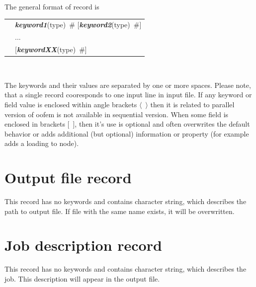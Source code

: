 \documentclass[a4paper]{article}
\makeatletter
\newcommand{\keywordnotype}[1]{\mbox{{\it{\bf{#1}}}}}
\newcommand{\keyword}[2]{\mbox{{\keywordnotype{#1}\tiny (#2)}}}
\newcommand{\field}[2]{\mbox{\keyword{#1}{#2}~\#}}
\newcommand{\optField}[2]{\mbox{[\field{#1}{#2}]}}
\newcommand{\Pmode}[1]{{\sffamily #1}}
\newenvironment{record}[1][]{\begin{tabular}{|ll}}{\end{tabular}\\}
\newcommand{\recentry}[2]{{#1}&{#2}\\}
\newcounter{rcc}
\newenvironment{record}[1][\textwidth]{\setcounter{rcc}{0}\begin{tabular*}{#1}{|ll@{\extracolsep{\fill}}r}}{\end{tabular*}\\}
\newcommand{\recentry}[2]{\ifthenelse{\value{rcc}>0}{&$\backslash$ \\}{\setcounter{rcc}{1}}{#1}&{#2}}
\makeatother
\begin{document}
The general format of record is \\

\noindent
\begin{record}
  \recentry{}{\field{keyword1}{type} \optField{keyword2}{type}}
  \recentry{}{...} \recentry{}{\optField{keywordXX}{type}}
\end{record}

The keywords and their values are separated by one or more spaces. Please note, that a single record cooresponds to one input line in input file. \Pmode{If any keyword or field value is enclosed within angle brackets $\langle$~$\rangle$ then it is related to parallel version of oofem is not available in sequential version. 
When some field is enclosed in brackets [~], then it's use is optional
and often overwrites the default behavior or adds additional (but
optional) information or property (for example adds a loading to
node). }

\section{Output file record}
\label{_OutputFileRecord}
This record has no keywords and contains character string, which
describes the path to output file. If file with the same name exists,
it will be overwritten.

\section{Job description record}
\label{_JobDescriptionRecord}
This record has no keywords and contains character string, which
describes the job. This description will appear in the output
file.
\end{document}
